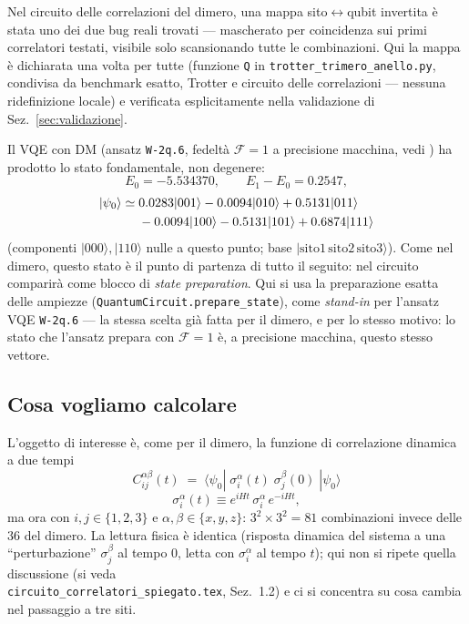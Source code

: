 \documentclass[11pt,a4paper]{article}
\newcommand{\ket}[1]{\lvert #1\rangle}
\begin{document}
\begin{warnbox}
Nel circuito delle correlazioni del dimero, una mappa sito$\leftrightarrow$qubit invertita è
stata uno dei due bug reali trovati --- mascherato per coincidenza sui primi correlatori
testati, visibile solo scansionando tutte le combinazioni. Qui la mappa è dichiarata una volta
per tutte (funzione \texttt{Q} in \texttt{trotter\_trimero\_anello.py}, condivisa da benchmark
esatto, Trotter e circuito delle correlazioni --- nessuna ridefinizione locale) e verificata
esplicitamente nella validazione di Sez.~\ref{sec:validazione}.
\end{warnbox}

Il VQE con DM (ansatz \texttt{W-2q.6}, fedeltà $\mathcal F=1$ a precisione macchina, vedi
\texttt{}) ha prodotto lo stato fondamentale, non degenere:
\begin{equation}
E_0=-5.534370,\qquad E_1-E_0=0.2547,
\end{equation}
\begin{align}
\ket{\psi_0}\simeq{}& 0.0283\ket{001}-0.0094\ket{010}+0.5131\ket{011} \notag\\
&-0.0094\ket{100}-0.5131\ket{101}+0.6874\ket{111}
\end{align}
(componenti $\ket{000},\ket{110}$ nulle a questo punto; base $\ket{\text{sito}1\,\text{sito}2\,\text{sito}3}$).
Come nel dimero, questo stato è il punto di partenza di tutto il seguito: nel circuito comparirà
come blocco di \emph{state preparation}. Qui si usa la preparazione esatta delle ampiezze
(\texttt{QuantumCircuit.prepare\_state}), come \emph{stand-in} per l'ansatz VQE \texttt{W-2q.6}
--- la stessa scelta già fatta per il dimero, e per lo stesso motivo: lo stato che l'ansatz prepara
con $\mathcal F=1$ è, a precisione macchina, questo stesso vettore.

\subsection{Cosa vogliamo calcolare}

L'oggetto di interesse è, come per il dimero, la funzione di correlazione dinamica a due tempi
\begin{equation}
\boxed{\;C_{ij}^{\alpha\beta}(t) \;=\; \langle\psi_0|\;\sigma_i^\alpha(t)\;\sigma_j^\beta(0)\;|\psi_0\rangle\;}
\label{eq:Cdef}
\end{equation}
\begin{equation}
\sigma_i^\alpha(t)\equiv e^{iHt}\,\sigma_i^\alpha\,e^{-iHt},
\end{equation}
ma ora con $i,j\in\{1,2,3\}$ e $\alpha,\beta\in\{x,y,z\}$: $3^2\times3^2=81$ combinazioni invece
delle $36$ del dimero. La lettura fisica è identica (risposta dinamica del sistema a una
``perturbazione'' $\sigma_j^\beta$ al tempo $0$, letta con $\sigma_i^\alpha$ al tempo $t$); qui non
si ripete quella discussione (si veda\\ \texttt{circuito\_correlatori\_spiegato.tex}, Sez.~1.2) e ci
si concentra su cosa cambia nel passaggio a tre siti.
\end{document}
